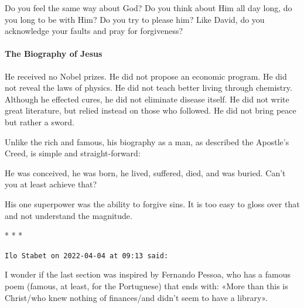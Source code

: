 Do you feel the same way about God? Do you think about Him all day long, do you long to be with Him? Do you try to please him? Like David, do you acknowledge your faults and pray for forgiveness?

\paragraph{The Biography of Jesus}
He received no Nobel prizes. He did not propose an economic program. He did not reveal the laws of physics. He did not teach better living through chemistry. Although he effected cures, he did not eliminate disease itself. He did not write great literature, but relied instead on those who followed. He did not bring peace but rather a sword.

Unlike the rich and famous, his biography as a man, as described the Apostle's Creed, is simple and straight-forward:

He was conceived, he was born, he lived, suffered, died, and was buried. Can't you at least achieve that?

His one superpower was the ability to forgive sins. It is too easy to gloss over that and not understand the magnitude.




\begin{center}* * *\end{center}

\begin{footnotesize}\begin{sffamily}



\texttt{Ilo Stabet on 2022-04-04 at 09:13 said: }

I wonder if the last section was inspired by Fernando Pessoa, who has a famous poem (famous, at least, for the Portuguese) that ends with: «More than this is Christ/who knew nothing of finances/and didn't seem to have a library».


\end{sffamily}\end{footnotesize}
